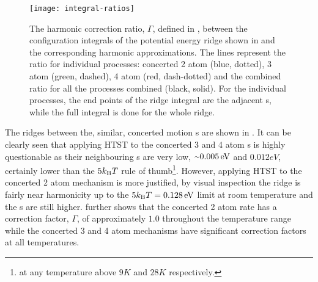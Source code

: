 \begin{SCfigure}[5.0][h]
\centering
\texttt{[image: integral-ratios]}
\caption{
The harmonic correction ratio, $\Gamma$, defined in ,
between the configuration integrals of the potential energy ridge shown in  and the corresponding harmonic approximations.
The lines represent the ratio for individual processes: concerted 2 atom (blue, dotted), 3 atom (green, dashed), 4 atom (red, dash-dotted) and the combined ratio for all the processes combined (black, solid).
For the individual processes, the end points of the ridge integral are the adjacent s, while the full integral is done for the whole ridge.
}
\label{fig:integral-ratios}
\end{SCfigure}

The ridges between the, similar, concerted motion s are shown in .
It can be clearly seen that applying HTST to the concerted 3 and 4 atom s is highly questionable as their neighbouring s are very low, $\mytilde 0.005\unit{eV}$ and $0.012\unit{eV}$, certainly lower than the $5k_\text{B} T$ rule of thumb\footnote{at any temperature above $9\unit{K}$ and $28\unit{K}$ respectively.}.
However, applying HTST to the concerted 2 atom mechanism is more justified, by visual inspection the ridge is fairly near harmonicity up to the $5k_\text{B} T = 0.128\, \mathrm{eV}$ limit at room temperature and the s are still higher.
 further shows that the concerted 2 atom rate has a correction factor, $\Gamma$, of approximately $1.0$ throughout the temperature range while the concerted 3 and 4 atom mechanisms have significant correction factors at all temperatures.

